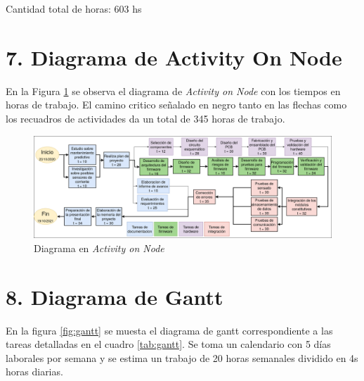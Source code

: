 \documentclass[11pt]{charter}
\begin{document}
Cantidad total de horas: 603 hs


\section{7. Diagrama de Activity On Node}
\label{sec:AoN}

En la Figura \ref{fig:AoN} se observa el diagrama de \textit{Activity on Node} con los tiempos en horas de trabajo. El camino critico señalado en negro tanto en las flechas como los recuadros de actividades da un total de 345 horas de trabajo.

\begin{figure}[htpb]
\centering 
\includegraphics[width=1\textwidth]{./Figuras/AoN.png}
\caption{Diagrama en \textit{Activity on Node}}
\label{fig:AoN}
\end{figure}


\section{8. Diagrama de Gantt}
\label{sec:gantt}

En la figura \ref{fig:gantt} se muesta el diagrama de gantt correspondiente a las tareas detalladas en el cuadro \ref{tab:gantt}. Se toma un calendario con 5 días laborales por semana y se estima un trabajo de 20 horas semanales dividido en 4s horas diarias.
\end{document}
